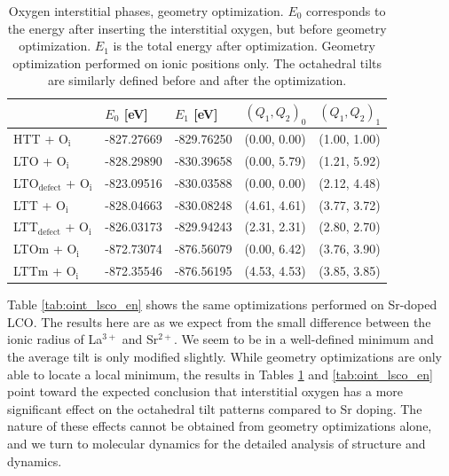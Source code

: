 \begin{table}[b]
	\centering
	\caption[Oxygen interstitial phases: Energy]{Oxygen interstitial phases, geometry optimization. $E_0$ corresponds to the energy after inserting the interstitial oxygen, but before geometry optimization. $E_1$ is the total energy after optimization. Geometry optimization performed on ionic positions only. The octahedral tilts are similarly defined before and after the optimization.}
	\label{tab:oint_lcoo_en}
	\begin{tabular}{@{}lllll@{}}
    \toprule
	 & $E_0$ [eV] & $E_1$ [eV] & $(Q_1, Q_2)_0$ & $(Q_1, Q_2)_1$  \\ 
	\midrule
    HTT + O$_\text{i}$                    & -827.27669             & -829.76250 & (0.00, 0.00) & (1.00, 1.00) \\
    LTO + O$_\text{i}$                    & -828.29890             & -830.39658  & (0.00, 5.79) & (1.21, 5.92) \\
    LTO$_\text{defect}$ + O$_\text{i}$            & -823.09516             & -830.03588  & (0.00, 0.00) & (2.12, 4.48) \\
    LTT + O$_\text{i}$                    & -828.04663             & -830.08248  & (4.61, 4.61) & (3.77, 3.72) \\
	LTT$_\text{defect}$ + O$_\text{i}$             & -826.03173             & -829.94243  & (2.31, 2.31) & (2.80, 2.70) \\
	LTOm + O$_\text{i}$                & -872.73074             & -876.56079  & (0.00, 6.42) & (3.76, 3.90) \\
	LTTm + O$_\text{i}$                & -872.35546             & -876.56195  & (4.53, 4.53) & (3.85, 3.85) \\
	\bottomrule
    \end{tabular}
\end{table}

Table \ref{tab:oint_lsco_en} shows the same optimizations performed on Sr-doped LCO. The results here are as we expect from the small difference between the ionic radius of La$^{3+}$ and Sr$^{2+}$. We seem to be in a well-defined minimum and the average tilt is only modified slightly. While geometry optimizations are only able to locate a local minimum, the results in Tables \ref{tab:oint_lcoo_en} and \ref{tab:oint_lsco_en} point toward the expected conclusion that interstitial oxygen has a more significant effect on the octahedral tilt patterns compared to Sr doping. The nature of these effects cannot be obtained from geometry optimizations alone, and we turn to molecular dynamics for the detailed analysis of structure and dynamics.

